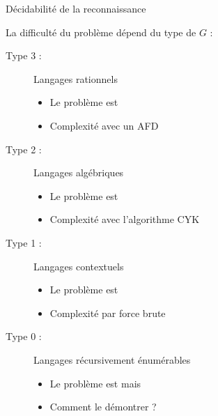 
\begingroup

\begin{frame}{Décidabilité de la reconnaissance}

  \vspace{-2mm}

  La difficulté du problème dépend du type de $G$ :
 
  \begin{description}
  \item[Type 3 :] Langages rationnels
    \begin{itemize}
    \item Le problème est 
    \item Complexité  avec un AFD
    \end{itemize}
  \item[Type 2 :] Langages algébriques
    \begin{itemize}
    \item Le problème est 
    \item Complexité  avec l'algorithme CYK
    \end{itemize}
  \item[Type 1 :] Langages contextuels
    \begin{itemize}
    \item Le problème est 
    \item Complexité  par force brute
    \end{itemize}
  \item[Type 0 :] Langages récursivement énumérables
    \begin{itemize}
    \item Le problème est  mais 
    \item \alert{Comment le démontrer ?}
    \end{itemize}
  \end{description}
 
\end{frame}

\endgroup
\endinput
